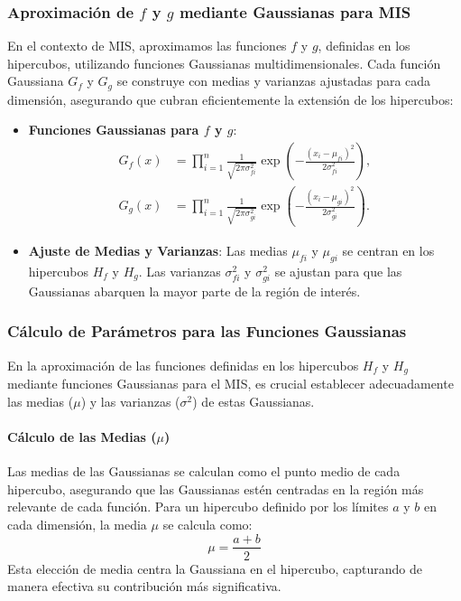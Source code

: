 \documentclass{article}
\begin{document}
\subsubsection{Aproximación de \( f \) y \( g \) mediante Gaussianas para MIS}
En el contexto de MIS, aproximamos las funciones \( f \) y \( g \), definidas en los hipercubos, utilizando funciones Gaussianas multidimensionales. Cada función Gaussiana \( G_f \) y \( G_g \) se construye con medias y varianzas ajustadas para cada dimensión, asegurando que cubran eficientemente la extensión de los hipercubos:

\begin{itemize}
    \item \textbf{Funciones Gaussianas para \( f \) y \( g \)}:
    \begin{align*}
        G_f(x) &= \prod_{i=1}^{n} \frac{1}{\sqrt{2\pi\sigma_{fi}^2}} \exp\left(-\frac{(x_i - \mu_{fi})^2}{2\sigma_{fi}^2}\right), \\
        G_g(x) &= \prod_{i=1}^{n} \frac{1}{\sqrt{2\pi\sigma_{gi}^2}} \exp\left(-\frac{(x_i - \mu_{gi})^2}{2\sigma_{gi}^2}\right).
    \end{align*}
    \item \textbf{Ajuste de Medias y Varianzas}: Las medias \( \mu_{fi} \) y \( \mu_{gi} \) se centran en los hipercubos \( H_f \) y \( H_g \). Las varianzas \( \sigma_{fi}^2 \) y \( \sigma_{gi}^2 \) se ajustan para que las Gaussianas abarquen la mayor parte de la región de interés.
\end{itemize}

\subsubsection{Cálculo de Parámetros para las Funciones Gaussianas}

En la aproximación de las funciones definidas en los hipercubos \( H_f \) y \( H_g \) mediante funciones Gaussianas para el MIS, es crucial establecer adecuadamente las medias (\( \mu \)) y las varianzas (\( \sigma^2 \)) de estas Gaussianas.

\paragraph{Cálculo de las Medias (\( \mu \))}
Las medias de las Gaussianas se calculan como el punto medio de cada hipercubo, asegurando que las Gaussianas estén centradas en la región más relevante de cada función. Para un hipercubo definido por los límites \( a \) y \( b \) en cada dimensión, la media \( \mu \) se calcula como:
$$
    \mu = \frac{a + b}{2}
$$
Esta elección de media centra la Gaussiana en el hipercubo, capturando de manera efectiva su contribución más significativa.
\end{document}
